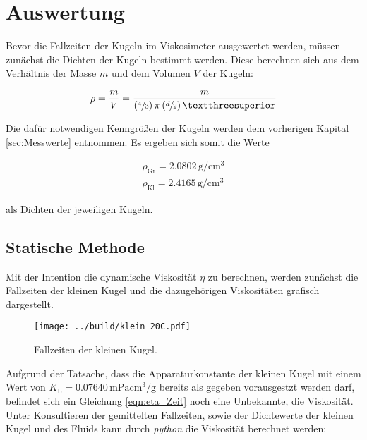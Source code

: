 


\section{Auswertung}
\label{sec:Auswertung}

Bevor die Fallzeiten der Kugeln im Viskosimeter ausgewertet werden, müssen zunächst die Dichten der Kugeln 
bestimmt werden. Diese berechnen sich aus dem Verhältnis der Masse $m$ und dem Volumen $V$ der Kugeln:

\begin{equation*}
    \rho = \frac{m}{V} = \frac{m}{\left(\sfrac{4}{3}\right)\pi\left(\sfrac{d}{2}\right)³}
\end{equation*}

\noindent Die dafür notwendigen Kenngrößen der Kugeln werden dem vorherigen Kapital \ref{sec:Messwerte} entnommen. Es 
ergeben sich somit die Werte

\begin{gather*}
    \rho_\text{Gr} = 2.0802\,\unit{\gram\per\centi\cubic\meter} \\
    \rho_\text{Kl} = 2.4165\,\unit{\gram\per\centi\cubic\meter}
\end{gather*}

\noindent als Dichten der jeweiligen Kugeln.

\subsection{Statische Methode}

Mit der Intention die dynamische Viskosität $\eta$ zu berechnen, werden zunächst die Fallzeiten der kleinen Kugel 
und die dazugehörigen Viskositäten grafisch dargestellt.

\begin{figure}[H]
    \centering
    \texttt{[image: ../build/klein\_20C.pdf]}
    \caption{Fallzeiten der kleinen Kugel.}
\end{figure}

\noindent Aufgrund der Tatsache, dass die Apparaturkonstante der kleinen Kugel mit einem Wert von
$K_\text{L} = 0.07640\,\unit{\milli\pascal\centi\cubic\meter\per\gram}$ bereits als gegeben vorausgestzt werden darf, 
befindet sich ein Gleichung \eqref{eqn:eta_Zeit} noch eine Unbekannte, die Viskosität. Unter Konsultieren der
gemittelten Fallzeiten, sowie der Dichtewerte der kleinen Kugel und des Fluids kann durch \emph{python} die Viskosität 
berechnet werden:

